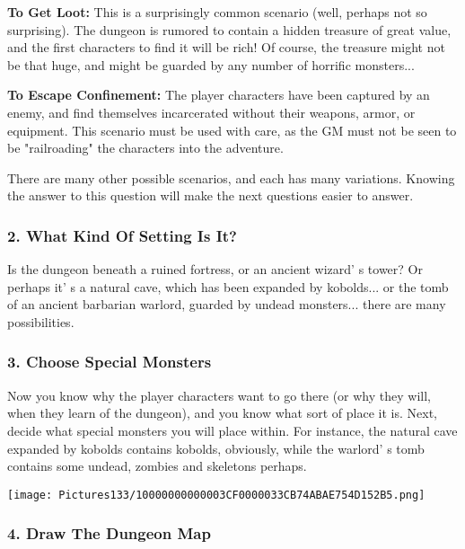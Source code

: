 \documentclass[a4paper,twoside,openany,10pt]{book}
\begin{document}
\begin{multicols}{2}
\textbf{To Get Loot:} This is a surprisingly common scenario (well, perhaps not so surprising). The dungeon is rumored to contain a hidden treasure of great value, and the first characters to find it will be rich! Of course, the treasure might not be that huge, and might be guarded by any number of horrific monsters...

\textbf{To Escape Confinement:} The player characters have been captured by an enemy, and find themselves incarcerated without their weapons, armor, or equipment. This scenario must be used with care, as the GM must not be seen to be "railroading" the characters into the adventure. 

There are many other possible scenarios, and each has many variations. Knowing the answer to this question will make the next questions easier to answer.

\subsubsection{2. What Kind Of Setting Is It?}\label{what-kind-of-setting-is-it}

Is the dungeon beneath a ruined fortress, or an ancient wizard' s tower? Or perhaps it' s a natural cave, which has been expanded by kobolds... or the tomb of an ancient barbarian warlord, guarded by undead monsters... there are many possibilities.

\subsubsection{3. Choose Special Monsters}\label{choose-special-monsters}

Now you know why the player characters want to go there (or why they will, when they learn of the dungeon), and you know what sort of place it is. Next, decide what special monsters you will place within. For instance, the natural cave expanded by kobolds contains kobolds, obviously, while the warlord' s tomb contains some undead, zombies and skeletons perhaps.

\begin{center}
	\texttt{[image: Pictures133/10000000000003CF0000033CB74ABAE754D152B5.png]}
\end{center}

\subsubsection{4. Draw The Dungeon Map}\label{draw-the-dungeon-map}


\end{multicols}
\end{document}
